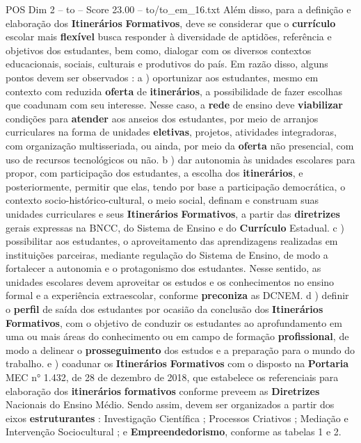 \begin{textsample}{POS Dim 2 – to – Score 23.00 – to/to\_em\_16.txt}
Além disso, para a definição e elaboração dos \textbf{Itinerários} \textbf{Formativos}, deve se considerar que o \textbf{currículo} escolar mais \textbf{flexível} busca responder à diversidade de aptidões, referência e objetivos dos estudantes, bem como, dialogar com os diversos contextos educacionais, sociais, culturais e produtivos do país.
Em razão disso, alguns pontos devem ser observados : a ) oportunizar aos estudantes, mesmo em contexto com reduzida \textbf{oferta} de \textbf{itinerários}, a possibilidade de fazer escolhas que coadunam com seu interesse.
Nesse caso, a \textbf{rede} de ensino deve \textbf{viabilizar} condições para \textbf{atender} aos anseios dos estudantes, por meio de arranjos curriculares na forma de unidades \textbf{eletivas}, projetos, atividades integradoras, com organização multisseriada, ou ainda, por meio da \textbf{oferta} não presencial, com uso de recursos tecnológicos ou não. b ) dar autonomia às unidades escolares para propor, com participação dos estudantes, a escolha dos \textbf{itinerários}, e posteriormente, permitir que elas, tendo por base a participação democrática, o contexto socio-histórico-cultural, o meio social, definam e construam suas unidades curriculares e seus \textbf{Itinerários} \textbf{Formativos}, a partir das \textbf{diretrizes} gerais expressas na BNCC, do Sistema de Ensino e do \textbf{Currículo} Estadual. c ) possibilitar aos estudantes, o aproveitamento das aprendizagens realizadas em instituições parceiras, mediante regulação do Sistema de Ensino, de modo a fortalecer a autonomia e o protagonismo dos estudantes.
Nesse sentido, as unidades escolares devem aproveitar os estudos e os conhecimentos no ensino formal e a experiência extraescolar, conforme \textbf{preconiza} as DCNEM. d ) definir o \textbf{perfil} de saída dos estudantes por ocasião da conclusão dos \textbf{Itinerários} \textbf{Formativos}, com o objetivo de conduzir os estudantes ao aprofundamento em uma ou mais áreas do conhecimento ou em campo de formação \textbf{profissional}, de modo a delinear o \textbf{prosseguimento} dos estudos e a preparação para o mundo do trabalho. e ) coadunar os \textbf{Itinerários} \textbf{Formativos} com o disposto na \textbf{Portaria} MEC n{\EmojiFont °} 1.432, de 28 de dezembro de 2018, que estabelece os referenciais para elaboração dos \textbf{itinerários} \textbf{formativos} conforme preveem as \textbf{Diretrizes} Nacionais do Ensino Médio.
Sendo assim, devem ser organizados a partir dos eixos \textbf{estruturantes} : Investigação Científica ; Processos Criativos ; Mediação e Intervenção Sociocultural ; e \textbf{Empreendedorismo}, conforme as tabelas 1 e 2.

\end{textsample}
